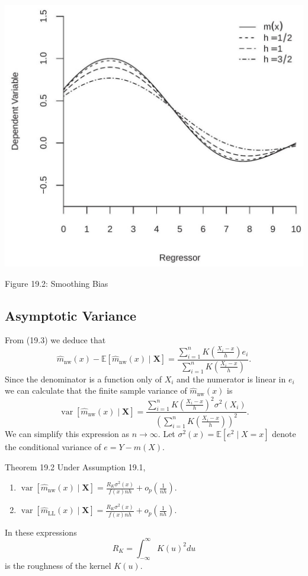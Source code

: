 \documentclass[10pt]{article}
\begin{document}
\includegraphics[max width=\textwidth]{2022_10_23_027876b875523fa3ea56g-08}

Figure 19.2: Smoothing Bias

\subsection{Asymptotic Variance}
From (19.3) we deduce that
$$
\widehat{m}_{\mathrm{nw}}(x)-\mathbb{E}\left[\widehat{m}_{\mathrm{nw}}(x) \mid \boldsymbol{X}\right]=\frac{\sum_{i=1}^{n} K\left(\frac{X_{i}-x}{h}\right) e_{i}}{\sum_{i=1}^{n} K\left(\frac{X_{i}-x}{h}\right)} .
$$
Since the denominator is a function only of $X_{i}$ and the numerator is linear in $e_{i}$ we can calculate that the finite sample variance of $\widehat{m}_{\mathrm{nw}}(x)$ is
$$
\operatorname{var}\left[\widehat{m}_{\mathrm{nw}}(x) \mid \boldsymbol{X}\right]=\frac{\sum_{i=1}^{n} K\left(\frac{X_{i}-x}{h}\right)^{2} \sigma^{2}\left(X_{i}\right)}{\left(\sum_{i=1}^{n} K\left(\frac{X_{i}-x}{h}\right)\right)^{2}} .
$$
We can simplify this expression as $n \rightarrow \infty$. Let $\sigma^{2}(x)=\mathbb{E}\left[e^{2} \mid X=x\right]$ denote the conditional variance of $e=Y-m(X)$.

Theorem 19.2 Under Assumption 19.1,

\begin{enumerate}
  \item $\operatorname{var}\left[\widehat{m}_{\mathrm{nw}}(x) \mid \boldsymbol{X}\right]=\frac{R_{K} \sigma^{2}(x)}{f(x) n h}+o_{p}\left(\frac{1}{n h}\right)$.

  \item $\operatorname{var}\left[\hat{m}_{\mathrm{LL}}(x) \mid \boldsymbol{X}\right]=\frac{R_{K} \sigma^{2}(x)}{f(x) n h}+o_{p}\left(\frac{1}{n h}\right)$.

\end{enumerate}
In these expressions
$$
R_{K}=\int_{-\infty}^{\infty} K(u)^{2} d u
$$
is the roughness of the kernel $K(u)$.
\end{document}
